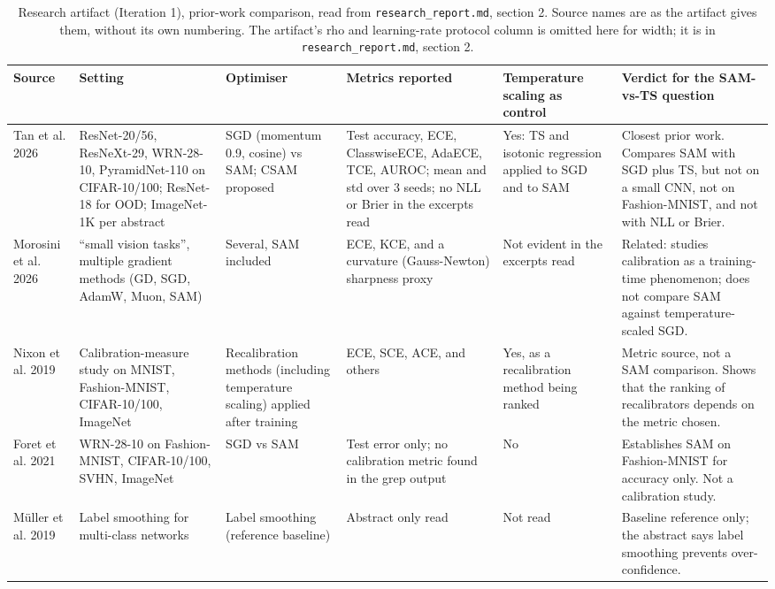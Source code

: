 \documentclass[11pt,letterpaper]{article}
\begin{document}
\begin{table}[!htbp]
\centering
\footnotesize
\caption{Research artifact (Iteration 1), prior-work comparison, read from \texttt{research\_report.md}, section 2. Source names are as the artifact gives them, without its own numbering. The artifact's rho and learning-rate protocol column is omitted here for width; it is in \texttt{research\_report.md}, section 2.}
\label{tab:research}
\begin{tabularx}{\linewidth}{>{\raggedright\arraybackslash}p{2.2cm}>{\raggedright\arraybackslash}p{3.0cm}>{\raggedright\arraybackslash}p{2.4cm}>{\raggedright\arraybackslash}X>{\raggedright\arraybackslash}p{2.6cm}>{\raggedright\arraybackslash}p{2.6cm}}
\toprule
Source & Setting & Optimiser & Metrics reported & Temperature scaling as control & Verdict for the SAM-vs-TS question \\
\midrule
Tan et al. 2026 & ResNet-20/56, ResNeXt-29, WRN-28-10, PyramidNet-110 on CIFAR-10/100; ResNet-18 for OOD; ImageNet-1K per abstract & SGD (momentum 0.9, cosine) vs SAM; CSAM proposed & Test accuracy, ECE, ClasswiseECE, AdaECE, TCE, AUROC; mean and std over 3 seeds; no NLL or Brier in the excerpts read & Yes: TS and isotonic regression applied to SGD and to SAM & Closest prior work. Compares SAM with SGD plus TS, but not on a small CNN, not on Fashion-MNIST, and not with NLL or Brier. \\
Morosini et al. 2026 & ``small vision tasks'', multiple gradient methods (GD, SGD, AdamW, Muon, SAM) & Several, SAM included & ECE, KCE, and a curvature (Gauss-Newton) sharpness proxy & Not evident in the excerpts read & Related: studies calibration as a training-time phenomenon; does not compare SAM against temperature-scaled SGD. \\
Nixon et al. 2019 & Calibration-measure study on MNIST, Fashion-MNIST, CIFAR-10/100, ImageNet & Recalibration methods (including temperature scaling) applied after training & ECE, SCE, ACE, and others & Yes, as a recalibration method being ranked & Metric source, not a SAM comparison. Shows that the ranking of recalibrators depends on the metric chosen. \\
Foret et al. 2021 & WRN-28-10 on Fashion-MNIST, CIFAR-10/100, SVHN, ImageNet & SGD vs SAM & Test error only; no calibration metric found in the grep output & No & Establishes SAM on Fashion-MNIST for accuracy only. Not a calibration study. \\
M\"uller et al. 2019 & Label smoothing for multi-class networks & Label smoothing (reference baseline) & Abstract only read & Not read & Baseline reference only; the abstract says label smoothing prevents over-confidence. \\
\bottomrule
\end{tabularx}
\end{table}
\end{document}
